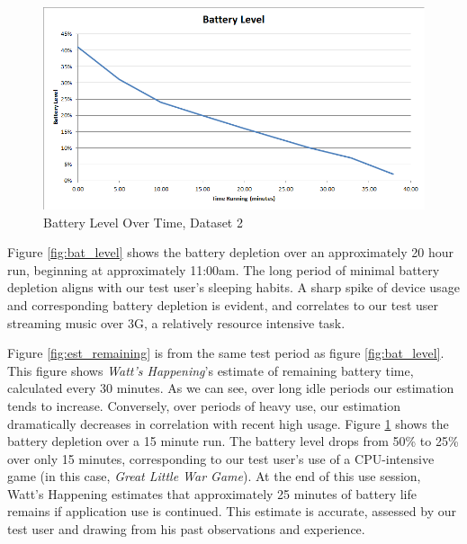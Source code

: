 \begin{figure}[h]
	\begin{center}
		\includegraphics[scale=0.5]{figs/BatteryLevelShort.png}
		\caption{Battery Level Over Time, Dataset 2}
		\label{fig:bat_vs_time_short}
\end{center}
\end{figure}
Figure \ref{fig:bat_level} shows the battery depletion over an approximately 20 hour run, beginning at approximately 11:00am. 
The long period of minimal battery depletion aligns with our test user's sleeping habits.
A sharp spike of device usage and corresponding battery depletion is evident, and correlates to our test user streaming music over 3G, a relatively resource intensive task.


Figure \ref{fig:est_remaining} is from the same test period as figure \ref{fig:bat_level}.
This figure shows \emph{Watt's Happening}'s estimate of remaining battery time, calculated every 30 minutes.
As we can see, over long idle periods our estimation tends to increase.
Conversely, over periods of heavy use, our estimation dramatically decreases in correlation with recent high usage.
Figure \ref{fig:bat_vs_time_short} shows the battery depletion over a 15 minute run.
The battery level drops from 50\% to 25\% over only 15 minutes, corresponding to our test user's use of a CPU-intensive game (in this case, \emph{Great Little War Game}\cite{glwg}).
At the end of this use session, Watt's Happening estimates that approximately 25 minutes of battery life remains if application use is continued.
This estimate is accurate, assessed by our test user and drawing from his past observations and experience.

